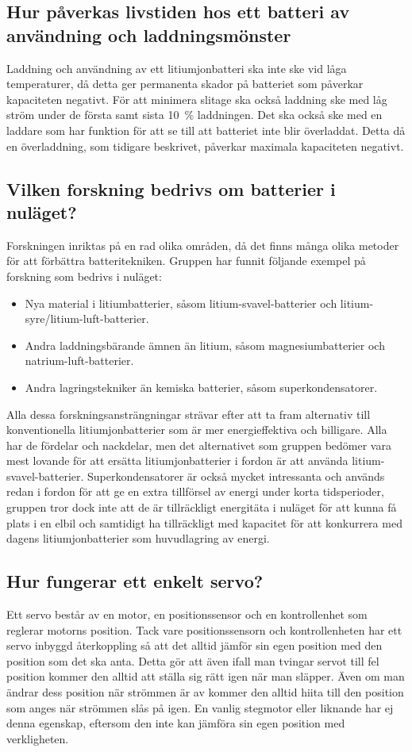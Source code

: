 \documentclass[a4paper,12pt]{article}
\begin{document}
\subsection{Hur påverkas livstiden hos ett batteri av användning och laddningsmönster}
Laddning och användning av ett litiumjonbatteri ska inte ske vid låga temperaturer, då detta ger permanenta skador på batteriet som påverkar kapaciteten negativt. För att minimera slitage ska också laddning ske med låg ström under de första samt sista 10~\% laddningen. Det ska också ske med en laddare som har funktion för att se till att batteriet inte blir överladdat. Detta då en överladdning, som tidigare beskrivet, påverkar maximala kapaciteten negativt.

\subsection{Vilken forskning bedrivs om batterier i nuläget?}
Forskningen inriktas på en rad olika områden, då det finns många olika metoder för att förbättra batteritekniken. Gruppen har funnit följande exempel på forskning som bedrivs i nuläget:
\begin{itemize}
\item Nya material i litiumbatterier, såsom litium-svavel-batterier och litium-syre/litium-luft-batterier.
\item Andra laddningsbärande ämnen än litium, såsom magnesiumbatterier och natrium-luft-batterier.
\item Andra lagringstekniker än kemiska batterier, såsom superkondensatorer.
\end{itemize}
Alla dessa forskningsansträngningar strävar efter att ta fram alternativ till konventionella litiumjonbatterier som är mer energieffektiva och billigare. Alla har de fördelar och nackdelar, men det alternativet som gruppen bedömer vara mest lovande för att ersätta litiumjonbatterier i fordon är att använda litium-svavel-batterier. Superkondensatorer är också mycket intressanta och används redan i fordon för att ge en extra tillförsel av energi under korta tidsperioder, gruppen tror dock inte att de är tillräckligt energitäta i nuläget för att kunna få plats i en elbil och samtidigt ha tillräckligt med kapacitet för att konkurrera med dagens litiumjonbatterier som huvudlagring av energi. 

\subsection{Hur fungerar ett enkelt servo?}
Ett servo består av en motor, en positionssensor och en kontrollenhet som reglerar motorns position. Tack vare positionssensorn och kontrollenheten har ett servo inbyggd återkoppling så att det alltid jämför sin egen position med den position som det ska anta. Detta gör att även ifall man tvingar servot till fel position kommer den alltid att ställa sig rätt igen när man släpper. Även om man ändrar dess position när strömmen är av kommer den alltid hiita till den position som anges när strömmen slås på igen. En vanlig stegmotor eller liknande har ej denna egenskap, eftersom den inte kan jämföra sin egen position med verkligheten.
\end{document}
